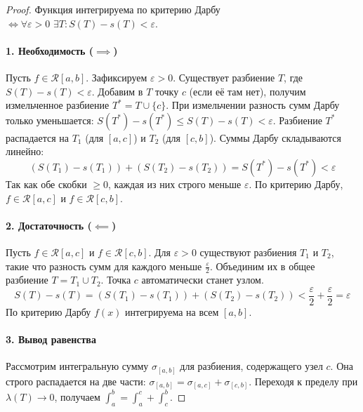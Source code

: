\vspace{0.5em}
\begin{center}
\end{center}
\vspace{0.5em}

\begin{proof}
Функция интегрируема по критерию Дарбу $\iff \forall \varepsilon > 0 \,\, \exists T: S(T) - s(T) < \varepsilon$.

\paragraph{1. Необходимость ($\implies$)} 
Пусть $f \in \mathcal{R}[a, b]$. Зафиксируем $\varepsilon > 0$. Существует разбиение $T$, где $S(T) - s(T) < \varepsilon$.
Добавим в $T$ точку $c$ (если её там нет), получим измельченное разбиение $T^* = T \cup \{c\}$. При измельчении разность сумм Дарбу только уменьшается: $S(T^*) - s(T^*) \le S(T) - s(T) < \varepsilon$.
Разбиение $T^*$ распадается на $T_1$ (для $[a, c]$) и $T_2$ (для $[c, b]$). Суммы Дарбу складываются линейно:
$$ (S(T_1) - s(T_1)) + (S(T_2) - s(T_2)) = S(T^*) - s(T^*) < \varepsilon $$
Так как обе скобки $\ge 0$, каждая из них строго меньше $\varepsilon$. По критерию Дарбу, $f \in \mathcal{R}[a, c]$ и $f \in \mathcal{R}[c, b]$.

\paragraph{2. Достаточность ($\impliedby$)}
Пусть $f \in \mathcal{R}[a, c]$ и $f \in \mathcal{R}[c, b]$. Для $\varepsilon > 0$ существуют разбиения $T_1$ и $T_2$, такие что разность сумм для каждого меньше $\frac{\varepsilon}{2}$.
Объединим их в общее разбиение $T = T_1 \cup T_2$. Точка $c$ автоматически станет узлом.
$$ S(T) - s(T) = (S(T_1) - s(T_1)) + (S(T_2) - s(T_2)) < \frac{\varepsilon}{2} + \frac{\varepsilon}{2} = \varepsilon $$
По критерию Дарбу $f(x)$ интегрируема на всем $[a, b]$.

\paragraph{3. Вывод равенства}
Рассмотрим интегральную сумму $\sigma_{[a,b]}$ для разбиения, содержащего узел $c$. Она строго распадается на две части: $\sigma_{[a,b]} = \sigma_{[a,c]} + \sigma_{[c,b]}$. Переходя к пределу при $\lambda(T) \to 0$, получаем $\int_a^b = \int_a^c + \int_c^b$.
\end{proof}


